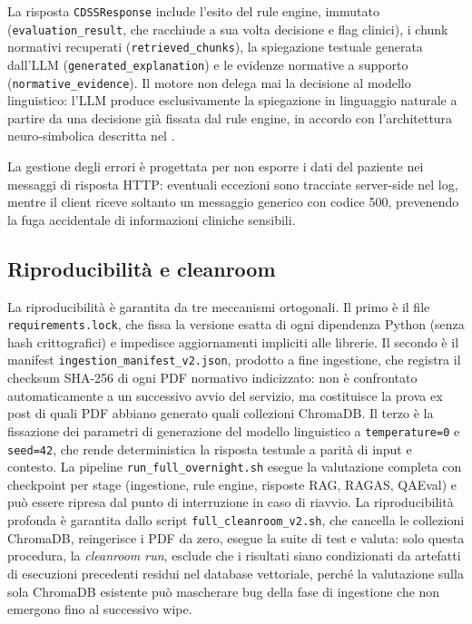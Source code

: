\begin{sloppypar}
La risposta \texttt{CDSSResponse} include l'esito del rule engine, immutato
(\texttt{evaluation\_result}, che racchiude a sua volta decisione e flag
clinici), i chunk normativi recuperati (\texttt{retrieved\_chunks}), la
spiegazione testuale generata dall'LLM (\texttt{generated\_explanation}) e
le evidenze normative a supporto (\texttt{normative\_evidence}). Il motore non delega mai la decisione al modello
linguistico: l'LLM produce esclusivamente la spiegazione in linguaggio naturale
a partire da una decisione già fissata dal rule engine, in accordo con
l'architettura neuro-simbolica descritta nel .
\end{sloppypar}

La gestione degli errori è progettata per non esporre i dati del paziente
nei messaggi di risposta HTTP: eventuali eccezioni sono tracciate server-side
nel log, mentre il client riceve soltanto un messaggio generico con codice
500, prevenendo la fuga accidentale di informazioni cliniche sensibili.

\subsection{Riproducibilità e cleanroom}
\label{subsec:reproducibility-impl}

\begin{sloppypar}
La riproducibilità è garantita da tre meccanismi ortogonali. Il primo è il
file \texttt{requirements.lock}, che fissa la versione esatta di ogni
dipendenza Python (senza hash crittografici) e impedisce aggiornamenti
impliciti alle librerie. Il secondo è il manifest
\texttt{ingestion\_manifest\_v2.json}, prodotto a fine ingestione, che
registra il checksum SHA-256 di ogni PDF normativo indicizzato: non è
confrontato automaticamente a un successivo avvio del servizio, ma
costituisce la prova ex post di quali PDF abbiano generato quali collezioni
ChromaDB. Il terzo è la fissazione dei parametri di generazione del
modello linguistico a \texttt{temperature=0} e \texttt{seed=42}, che rende
deterministica la risposta testuale a parità di input e contesto. La pipeline
\texttt{run\_full\_overnight.sh} esegue la valutazione completa con
checkpoint per stage (ingestione, rule engine, risposte RAG, RAGAS,
QAEval) e può essere ripresa dal punto di interruzione in caso di riavvio.
La riproducibilità profonda è garantita dallo script
\texttt{full\_cleanroom\_v2.sh}, che cancella le collezioni ChromaDB,
reingerisce i PDF da zero, esegue la suite di test e valuta: solo questa
procedura, la \emph{cleanroom run}, esclude che i risultati siano
condizionati da artefatti di esecuzioni precedenti residui nel database
vettoriale, perché la valutazione sulla sola ChromaDB esistente può mascherare
bug della fase di ingestione che non emergono fino al successivo wipe.
\end{sloppypar}

